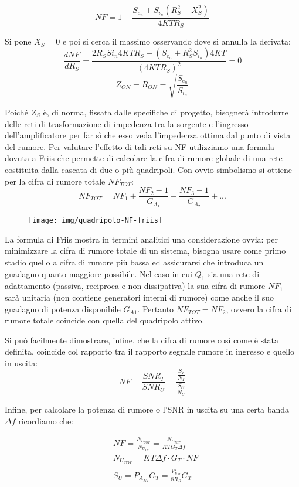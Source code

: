 \[NF = 1 + \frac{S_{e_n} + S_{i_n}(R_S^2 + X_S^2)}{4KTR_S}\]

Si pone $X_S =  0$ e poi si cerca il massimo osservando dove si annulla la derivata:
\[\frac{dNF}{dR_S} = \frac{2R_S S{i_n} 4KTR_S - \left(S_{e_n} + R_S^2 S_{i_n}\right)4KT}{(4KTR_S)^2} = 0\]
\[Z_{ON} = R_{ON}= \sqrt{\frac{S_{e_n}}{S_{i_n}}}\]

Poiché $Z_S$ è, di norma, fissata dalle specifiche di progetto, bisognerà introdurre delle reti di 	trasformazione di impedenza tra la sorgente e l'ingresso dell'amplificatore per far sì che esso veda	l'impedenza ottima dal punto di vista del rumore.
Per valutare l'effetto di tali reti su NF utilizziamo una formula dovuta a Friis che permette di calcolare la cifra di rumore globale di una rete costituita dalla cascata di due o più quadripoli.
Con ovvio simbolismo si ottiene per la cifra di rumore totale $NF_{TOT}$:
\[NF_{TOT} = NF_1 + \frac{NF_2 - 1}{G_{A_1}} + \frac{NF_3 - 1}{G_{A_2}} + ...\]

\begin{figure}[h]
	\centering
	\texttt{[image: img/quadripolo-NF-friis]}
	\caption{}
	\label{fig:cifrarumore-3}
\end{figure}

La formula di Friis mostra in termini analitici una considerazione ovvia: per minimizzare la cifra di
rumore totale di un sistema, bisogna usare come primo stadio quello a cifra di rumore più bassa ed
assicurarsi che introduca un guadagno quanto maggiore possibile.
Nel caso in cui $Q_1$ sia una rete di adattamento (passiva, reciproca e non dissipativa) la sua cifra di
rumore $NF_1$ sarà unitaria (non contiene generatori interni di rumore) come anche il suo guadagno di
potenza disponibile $G_{A1}$. Pertanto $NF_{TOT} = NF_2$, ovvero la cifra di rumore totale coincide con quella del quadripolo attivo.

Si può facilmente dimostrare, infine, che la cifra di rumore così come è stata definita, coincide col
rapporto tra il rapporto segnale rumore in ingresso e quello in uscita:
\[NF = \frac{SNR_I}{SNR_U} = \frac{\frac{S_I}{N_I}}{\frac{S_U}{N_U}}\]

Infine, per calcolare la potenza di rumore o l'SNR in uscita su una certa banda $\Delta f$ ricordiamo che:

\begin{align*}
&NF = \frac{N_{U_{TOT}}}{N_{U_{IN}}} = \frac{N_{U_{TOT}}}{KT G_T \Delta f}\\
&N_{U_{TOT}} = KT \Delta f \cdot G_T \cdot NF\\
&S_{U} = P_{A_{IN}} G_T = \frac{V_{S_M}^2}{8R_S} G_T
\end{align*}

